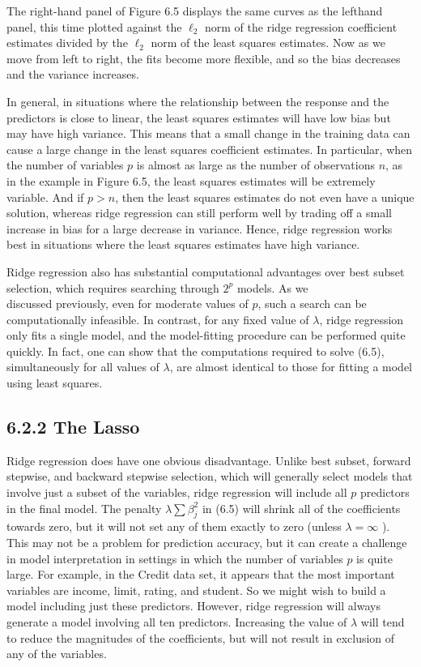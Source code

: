 \documentclass[10pt]{article}
\begin{document}
The right-hand panel of Figure 6.5 displays the same curves as the lefthand panel, this time plotted against the $\ell_{2}$ norm of the ridge regression coefficient estimates divided by the $\ell_{2}$ norm of the least squares estimates. Now as we move from left to right, the fits become more flexible, and so the bias decreases and the variance increases.

In general, in situations where the relationship between the response and the predictors is close to linear, the least squares estimates will have low bias but may have high variance. This means that a small change in the training data can cause a large change in the least squares coefficient estimates. In particular, when the number of variables $p$ is almost as large as the number of observations $n$, as in the example in Figure 6.5, the least squares estimates will be extremely variable. And if $p>n$, then the least squares estimates do not even have a unique solution, whereas ridge regression can still perform well by trading off a small increase in bias for a large decrease in variance. Hence, ridge regression works best in situations where the least squares estimates have high variance.

Ridge regression also has substantial computational advantages over best subset selection, which requires searching through $2^{p}$ models. As we\\
discussed previously, even for moderate values of $p$, such a search can be computationally infeasible. In contrast, for any fixed value of $\lambda$, ridge regression only fits a single model, and the model-fitting procedure can be performed quite quickly. In fact, one can show that the computations required to solve (6.5), simultaneously for all values of $\lambda$, are almost identical to those for fitting a model using least squares.

\subsection*{6.2.2 The Lasso}
Ridge regression does have one obvious disadvantage. Unlike best subset, forward stepwise, and backward stepwise selection, which will generally select models that involve just a subset of the variables, ridge regression will include all $p$ predictors in the final model. The penalty $\lambda \sum \beta_{j}^{2}$ in (6.5) will shrink all of the coefficients towards zero, but it will not set any of them exactly to zero (unless $\lambda=\infty$ ). This may not be a problem for prediction accuracy, but it can create a challenge in model interpretation in settings in which the number of variables $p$ is quite large. For example, in the Credit data set, it appears that the most important variables are income, limit, rating, and student. So we might wish to build a model including just these predictors. However, ridge regression will always generate a model involving all ten predictors. Increasing the value of $\lambda$ will tend to reduce the magnitudes of the coefficients, but will not result in exclusion of any of the variables.
\end{document}
